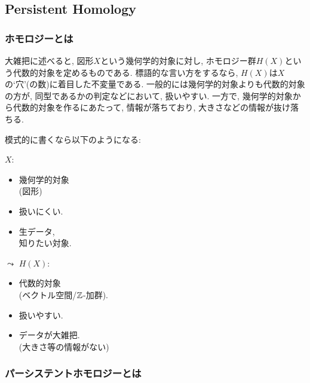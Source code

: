 \subsection{Persistent Homology}
\subsubsection{ホモロジーとは}

大雑把に述べると,
図形$X$という幾何学的対象に対し,
ホモロジー群$H(X)$という代数的対象を定めるものである.
標語的な言い方をするなら,
$H(X)$は$X$の`穴'(の数)に着目した不変量である.
一般的には幾何学的対象よりも代数的対象の方が,
同型であるかの判定などにおいて,
扱いやすい.
一方で,
幾何学的対象から代数的対象を作るにあたって,
情報が落ちており, 大きさなどの情報が抜け落ちる.


\begin{remark}
模式的に書くなら以下のようになる:
  \begin{center}
$X$:
\begin{minipage}{0.3\textwidth}
\begin{itemize}
\item 幾何学的対象
  \\(図形)
\item 扱いにくい.
\item 生データ,\\
  知りたい対象.
\end{itemize}
\end{minipage}
$\leadsto$
$H(X)$:
\begin{minipage}{0.4\textwidth}
\begin{itemize}
\item 代数的対象
\\
  (ベクトル空間/$\mathbb{Z}$-加群).
\item 扱いやすい.
\item データが大雑把. \\
  (大きさ等の情報がない)
\end{itemize}
\end{minipage}
\end{center}
\end{remark}

\subsubsection{パーシステントホモロジーとは}

